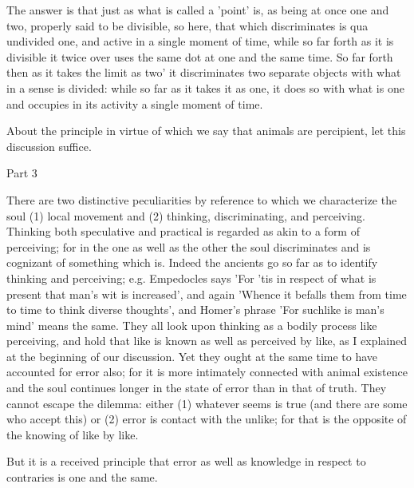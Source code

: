 The answer is that just as what is called a 'point' is, as being at
once one and two, properly said to be divisible, so here, that which
discriminates is qua undivided one, and active in a single moment
of time, while so far forth as it is divisible it twice over uses
the same dot at one and the same time. So far forth then as it takes
the limit as two' it discriminates two separate objects with what
in a sense is divided: while so far as it takes it as one, it does
so with what is one and occupies in its activity a single moment of
time. 

About the principle in virtue of which we say that animals are percipient,
let this discussion suffice. 

Part 3

There are two distinctive peculiarities by reference to which we characterize
the soul (1) local movement and (2) thinking, discriminating, and
perceiving. Thinking both speculative and practical is regarded as
akin to a form of perceiving; for in the one as well as the other
the soul discriminates and is cognizant of something which is. Indeed
the ancients go so far as to identify thinking and perceiving; e.g.
Empedocles says 'For 'tis in respect of what is present that man's
wit is increased', and again 'Whence it befalls them from time to
time to think diverse thoughts', and Homer's phrase 'For suchlike
is man's mind' means the same. They all look upon thinking as a bodily
process like perceiving, and hold that like is known as well as perceived
by like, as I explained at the beginning of our discussion. Yet they
ought at the same time to have accounted for error also; for it is
more intimately connected with animal existence and the soul continues
longer in the state of error than in that of truth. They cannot escape
the dilemma: either (1) whatever seems is true (and there are some
who accept this) or (2) error is contact with the unlike; for that
is the opposite of the knowing of like by like. 

But it is a received principle that error as well as knowledge in
respect to contraries is one and the same. 

